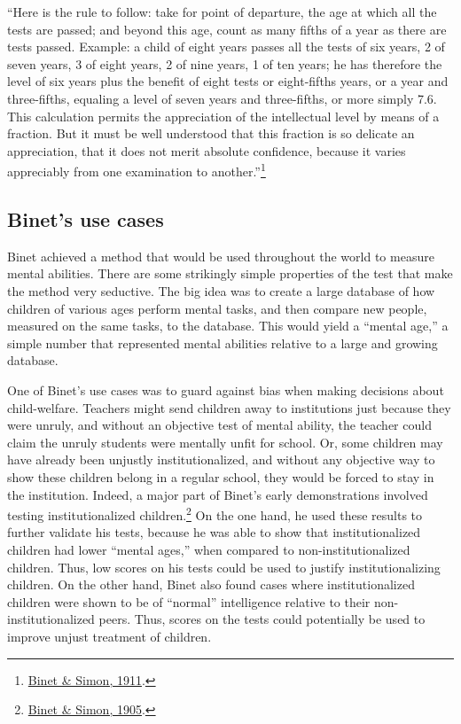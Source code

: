 \documentclass[
  oneside,
  12pt]{crumpbook}
\begin{document}
``Here is the rule to follow: take for point of departure, the age at which all the tests are passed; and beyond this age, count as many fifths of a year as there are tests passed. Example: a child of eight years passes all the tests of six years, 2 of seven years, 3 of eight years, 2 of nine years, 1 of ten years; he has therefore the level of six years plus the benefit of eight tests or eight-fifths years, or a year and three-fifths, equaling a level of seven years and three-fifths, or more simply 7.6. This calculation permits the appreciation of the intellectual level by means of a fraction. But it must be well understood that this fraction is so delicate an appreciation, that it does not merit absolute confidence, because it varies appreciably from one examination to another.''\footnote{\protect\hyperlink{ref-binetNewInvestigationsMeasure1911}{Binet \& Simon, 1911}.}

\hypertarget{binets-use-cases}{%
\subsection{Binet's use cases}\label{binets-use-cases}}

Binet achieved a method that would be used throughout the world to measure mental abilities. There are some strikingly simple properties of the test that make the method very seductive. The big idea was to create a large database of how children of various ages perform mental tasks, and then compare new people, measured on the same tasks, to the database. This would yield a ``mental age,'' a simple number that represented mental abilities relative to a large and growing database.

One of Binet's use cases was to guard against bias when making decisions about child-welfare. Teachers might send children away to institutions just because they were unruly, and without an objective test of mental ability, the teacher could claim the unruly students were mentally unfit for school. Or, some children may have already been unjustly institutionalized, and without any objective way to show these children belong in a regular school, they would be forced to stay in the institution. Indeed, a major part of Binet's early demonstrations involved testing institutionalized children.\footnote{\protect\hyperlink{ref-binetNecessityEstablishingScientific1905}{Binet \& Simon, 1905}.} On the one hand, he used these results to further validate his tests, because he was able to show that institutionalized children had lower ``mental ages,'' when compared to non-institutionalized children. Thus, low scores on his tests could be used to justify institutionalizing children. On the other hand, Binet also found cases where institutionalized children were shown to be of ``normal'' intelligence relative to their non-institutionalized peers. Thus, scores on the tests could potentially be used to improve unjust treatment of children.
\end{document}
